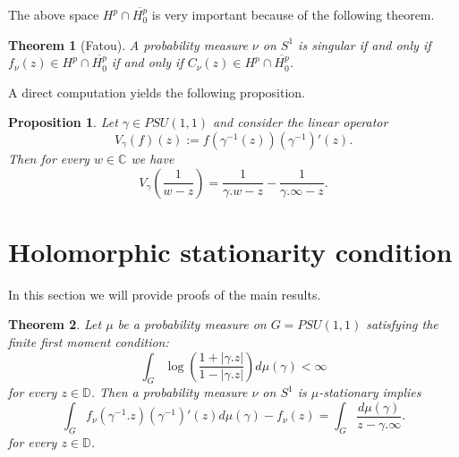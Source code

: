 \documentclass[11pt]{article}
\newtheorem{theorem}{Theorem}[section]
\newtheorem{proposition}{Proposition}[section]
\begin{document}
The above space $H^p \cap \overline{H^p_0}$ is very important because of the following theorem.

\begin{theorem}[Fatou]
	A probability measure $\nu$ on $S^1$ is singular if and only if $f_\nu(z) \in H^p \cap \overline{H_0^p}$ if and only if $C_\nu(z) \in H^p \cap \overline{H_0^p}$.
\end{theorem}

A direct computation yields the following proposition.

\begin{proposition}
	\label{weighted composition ops}
	Let $\gamma \in PSU(1,1)$ and consider the linear operator
	\[
	V_\gamma(f)(z) := f(\gamma^{-1}(z)) (\gamma^{-1})'(z).
	\] 
	Then for every $w \in \mathbb{C}$ we have
	\[
		V_\gamma \left( \frac{1}{w - z} \right) = \frac{1}{\gamma.w - z} - \frac{1}{\gamma.\infty - z}.
	\]
\end{proposition}

\section{Holomorphic stationarity condition}
\label{Holomorphic stationarity condition}
In this section we will provide proofs of the main results.
\begin{theorem}
	Let $\mu$ be a probability measure on $G=PSU(1,1)$ satisfying the finite first moment condition:
	\begin{equation}
		\int_{G} \log\left( \frac{1 + |\gamma.z| }{1 - |\gamma.z|} \right)  d \mu (\gamma) < \infty
	\end{equation}
	for every $z \in \mathbb{D}$.	Then a probability measure $\nu$ on $S^1$ is $\mu$-stationary implies
	\begin{equation}
		\label{main equation, simp}
		\int_G f_\nu(\gamma^{-1}.z)(\gamma^{-1})'(z)  d\mu(\gamma) - f_\nu(z) = \int_G \frac{d \mu(\gamma)}{z - \gamma.\infty}.
	\end{equation}
	for every $z \in \mathbb{D}$.
\end{theorem}
\end{document}
